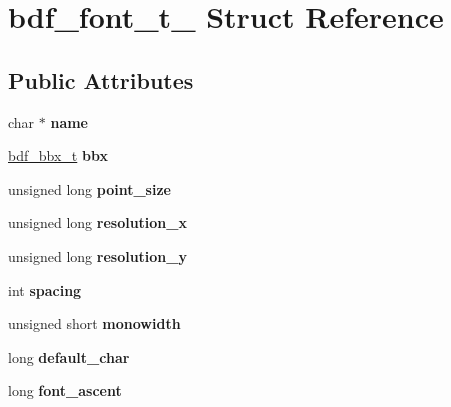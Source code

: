 \hypertarget{structbdf__font__t__}{}\section{bdf\+\_\+font\+\_\+t\+\_\+ Struct Reference}
\label{structbdf__font__t__}
\subsection*{Public Attributes}
\begin{DoxyCompactItemize}
\item 
\mbox{\label{structbdf__font__t___a5913d87c013e04f6ed008bf2c1ae0502}} 
char $\ast$ {\bfseries name}
\item 
\mbox{\label{structbdf__font__t___ac25edda068db746ec01932109af48b4e}} 
\hyperlink{structbdf__bbx__t__}{bdf\+\_\+bbx\+\_\+t} {\bfseries bbx}
\item 
\mbox{\label{structbdf__font__t___a7b86c5e8b027880389d3255526579776}} 
unsigned long {\bfseries point\+\_\+size}
\item 
\mbox{\label{structbdf__font__t___afdd5a28e6c56664ebfd81fba2502fc71}} 
unsigned long {\bfseries resolution\+\_\+x}
\item 
\mbox{\label{structbdf__font__t___aeba1172f024b045f38e2ec774fdac0f2}} 
unsigned long {\bfseries resolution\+\_\+y}
\item 
\mbox{\label{structbdf__font__t___a694b45a3d4def047a24930af5d278f6b}} 
int {\bfseries spacing}
\item 
\mbox{\label{structbdf__font__t___a2b9b2e657fce04c5424a672a6bcbfa71}} 
unsigned short {\bfseries monowidth}
\item 
\mbox{\label{structbdf__font__t___a9dd5cd8b98d884377ad8d0fa1c23b02a}} 
long {\bfseries default\+\_\+char}
\item 
\mbox{\label{structbdf__font__t___ad084dda66e6006218775631e24a6c783}} 
long {\bfseries font\+\_\+ascent}

\end{DoxyCompactItemize}
